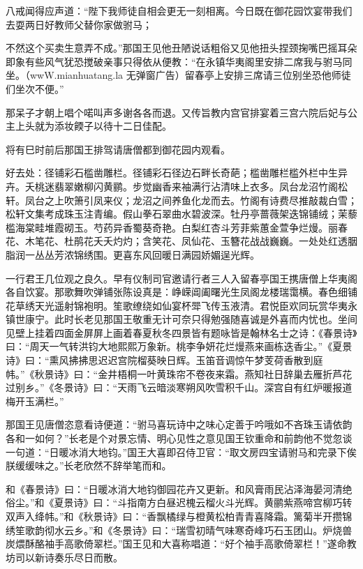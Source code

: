 \documentclass[12pt,UTF8]{ctexbook}
\begin{document}
{	八戒闻得应声道：“陛下我师徒自相会更无一刻相离。今日既在御花园饮宴带我们去耍两日好教师父替你家做驸马；
	
	不然这个买卖生意弄不成。”那国王见他丑陋说话粗俗又见他扭头捏颈掬嘴巴摇耳朵即象有些风气犹恐搅破亲事只得依从便教：“在永镇华夷阁里安排二席我与驸马同坐。（wwW.mianhuatang.la 无弹窗广告）留春亭上安排三席请三位别坐恐他师徒们坐次不便。”
	
	那呆子才朝上唱个喏叫声多谢各各而退。又传旨教内宫官排宴着三宫六院后妃与公主上头就为添妆餪子以待十二日佳配。
	
	将有巳时前后那国王排驾请唐僧都到御花园内观看。
	
	好去处：径铺彩石槛凿雕栏。径铺彩石径边石畔长奇葩；槛凿雕栏槛外栏中生异卉。夭桃迷翡翠嫩柳闪黄鹂。步觉幽香来袖满行沾清味上衣多。凤台龙沼竹阁松轩。凤台之上吹箫引凤来仪；龙沼之间养鱼化龙而去。竹阁有诗费尽推敲裁白雪；松轩文集考成珠玉注青编。假山拳石翠曲水碧波深。牡丹亭蔷薇架迭锦铺绒；茉藜槛海棠畦堆霞砌玉。芍药异香蜀葵奇艳。白梨红杏斗芳菲紫蕙金萱争烂熳。丽春花、木笔花、杜鹃花夭夭灼灼；含笑花、凤仙花、玉簪花战战巍巍。一处处红透胭脂润一丛丛芳浓锦绣围。更喜东风回暖日满园娇媚逞光辉。
	
	一行君王几位观之良久。早有仪制司官邀请行者三人入留春亭国王携唐僧上华夷阁各自饮宴。那歌舞吹弹铺张陈设真是：峥嵘阊阖曙光生凤阁龙楼瑞霭横。春色细铺花草绣天光遥射锦袍明。笙歌缭绕如仙宴杯斝飞传玉液清。君悦臣欢同玩赏华夷永镇世康宁。此时长老见那国王敬重无计可奈只得勉强随喜诚是外喜而内忧也。坐间见壁上挂着四面金屏屏上画着春夏秋冬四景皆有题咏皆是翰林名士之诗：《春景诗》曰：“周天一气转洪钧大地熙熙万象新。桃李争妍花烂熳燕来画栋迭香尘。”《夏景诗》曰：“熏风拂拂思迟迟宫院榴葵映日辉。玉笛音调惊午梦芰荷香散到庭帏。”《秋景诗》曰：“金井梧桐一叶黄珠帘不卷夜来霜。燕知社日辞巢去雁折芦花过别乡。”《冬景诗》曰：“天雨飞云暗淡寒朔风吹雪积千山。深宫自有红炉暖报道梅开玉满栏。”
	
	那国王见唐僧恣意看诗便道：“驸马喜玩诗中之味心定善于吟哦如不吝珠玉请依韵各和一如何？”长老是个对景忘情、明心见性之意见国王钦重命和前韵他不觉忽谈一句道：“日暖冰消大地钧。”国王大喜即召侍卫官：“取文房四宝请驸马和完录下俟朕缓缓味之。”长老欣然不辞举笔而和。
	
	和《春景诗》曰：“日暖冰消大地钧御园花卉又更新。和风膏雨民沾泽海晏河清绝俗尘。”和《夏景诗》曰：“斗指南方白昼迟槐云榴火斗光辉。黄鹂紫燕啼宫柳巧转双声入绛帏。”和《秋景诗》曰：“香飘橘绿与橙黄松柏青青喜降霜。篱菊半开攒锦绣笙歌韵彻水云乡。”和《冬景诗》曰：“瑞雪初晴气味寒奇峰巧石玉团山。炉烧兽炭煨酥酪袖手高歌倚翠栏。”国王见和大喜称唱道：“好个袖手高歌倚翠栏！”遂命教坊司以新诗奏乐尽日而散。
	
}
\end{document}
